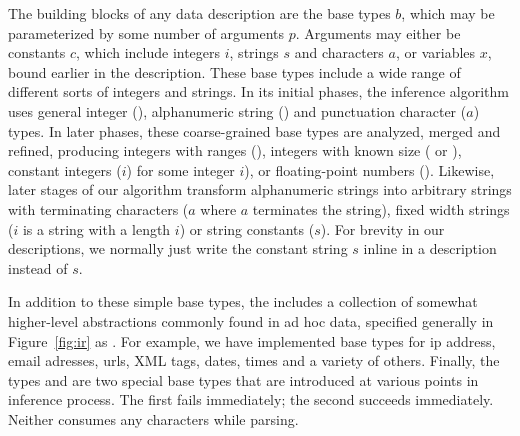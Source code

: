 The building blocks of any \ir{} data description are the base types $b$,
which may be parameterized by some number of arguments $p$.  Arguments
may either be constants $c$, which include integers $i$, strings
$s$ and characters $a$, or variables $x$, bound earlier in the description.
These base types include a wide range of different sorts of
integers and strings.  In its initial phases, the inference algorithm
uses general integer (), alphanumeric string ()
and punctuation character ($a$\cd{)}) types.  In later phases,
these coarse-grained base types are analyzed, merged and refined, producing
integers with ranges (),
integers with known size ( or ), constant integers
($i$\cd{)}) for some integer $i$), or floating-point
numbers ().  Likewise, later stages of our algorithm transform
alphanumeric strings into arbitrary strings with terminating characters
($a$\cd{)} where $a$ terminates the string), fixed width
strings ($i$\cd{)} is a string with a length $i$) 
or string constants  ($s$\cd{)}).  For brevity in
our descriptions, we normally just write the constant string $s$
inline in a description instead of $s$\cd{)}.

In addition to these simple base types, the \ir{} includes a
collection of somewhat higher-level abstractions commonly found in ad
hoc data, specified generally in Figure~\ref{fig:ir} as .
For example, we have implemented base types for ip address, email
adresses, urls, XML tags, dates, times and a variety of
others. Finally, the types  and  are two special
base types that are introduced at various points in inference process.
The first fails immediately; the second succeeds immediately.  Neither
consumes any characters while parsing.

